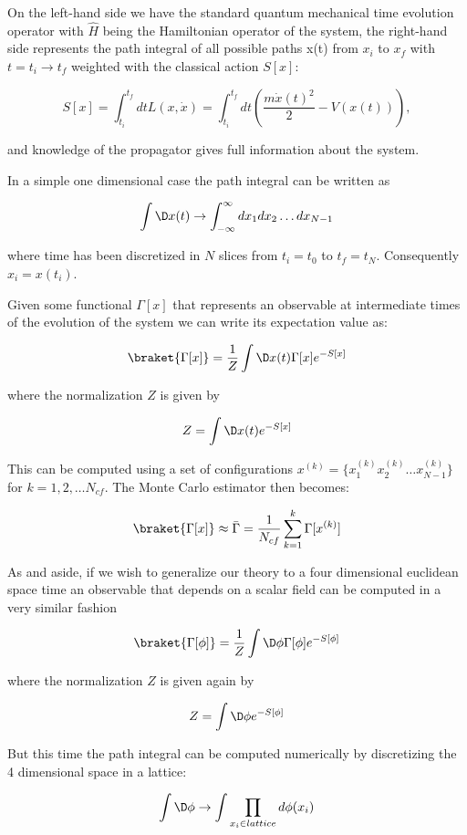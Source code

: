 \documentclass[%
oneside,                 %
final,                   %
10pt]{article}
\begin{document}
On the left-hand side we have the standard quantum mechanical time
evolution operator with $\hat{H}$ being the Hamiltonian operator of
the system, the right-hand side represents the path integral of all possible paths
x(t) from $x_i$ to $x_f$ with $t = t_i \rightarrow t_f$ weighted with
the classical action $S[x]$:

\[
	S[x] = \int_{t_i}^{t_f} dt L(x,\dot{x}) =  \int_{t_i}^{t_f} dt \left( \frac{m\dot{x}(t)^2}{2} - V(x(t))\right),
\]

and  knowledge of the propagator gives full information about the system.

In a simple one dimensional case the path integral can be written as

\[
	 \int \D x(t) \rightarrow \int_{-\infty}^{\infty} dx_1dx_2\dots dx_{N-1}
\]

where time has been discretized in $N$ slices from $t_i = t_0$ to $t_f = t_N$. Consequently $x_i = x(t_i)$.  

Given some functional $\Gamma[x]$ that represents an observable at
intermediate times of the evolution of the system we can write its
expectation value as:

\[
	\braket{\Gamma[x]} = \frac{1}{Z} \int \D x(t) \Gamma[x] e^{-S[x]}
\]

where the normalization $Z$ is given by 

\[
	Z = \int \D x(t) e^{-S[x]}
\]

This can be computed using a set of configurations $x^{(k)} =
\{x^{(k)}_1x^{(k)}_2\dots x^{(k)}_{N-1} \}$ for $k = 1,2,\dots
N_{cf}$. The Monte Carlo estimator then becomes:

\[
	\braket{\Gamma[x]} \approx \bar{\Gamma} = \frac{1}{N_{cf}} \sum_{k = 1}^k \Gamma[x^{(k)}]
\]

As and aside, if we wish to  generalize our theory to a four dimensional
euclidean space time an observable that depends on a scalar field can
be computed in a very similar fashion

\[
	\braket{\Gamma[\phi]} = \frac{1}{Z} \int \D \phi \Gamma[\phi] e^{-S[\phi]}
\]

where the normalization $Z$ is given again by 

\[
	Z = \int \D \phi e^{-S[\phi]}
\]

But this time the path integral can be computed numerically by discretizing the 4 dimensional space in a lattice:

\[
	 \int \D \phi \rightarrow \int \prod_{x_i \in lattice} d\phi(x_i)
\] 
\end{document}
